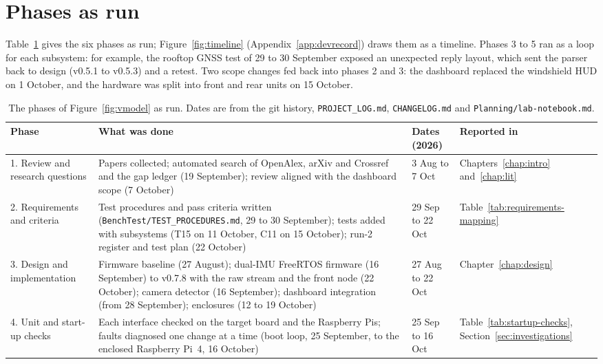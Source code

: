 \section{Phases as run}
\label{sec:phases}

Table~\ref{tab:phases} gives the six phases as run; Figure~\ref{fig:timeline} (Appendix~\ref{app:devrecord}) draws them as a timeline. Phases 3 to 5 ran as a loop for each subsystem: for example, the rooftop GNSS test of 29 to 30 September exposed an unexpected reply layout, which sent the parser back to design (v0.5.1 to v0.5.3) and a retest. Two scope changes fed back into phases 2 and 3: the dashboard replaced the windshield HUD on 1 October, and the hardware was split into front and rear units on 15 October.

\begin{table}[htbp]
\centering
\small
\caption[The phases of Figure~\ref{fig:vmodel} as run]{The phases of Figure~\ref{fig:vmodel} as run. Dates are from the git history, \texttt{PROJECT\_LOG.md}, \texttt{CHANGELOG.md} and \texttt{Planning/lab-notebook.md}.}
\label{tab:phases}
\begin{tabular}{|p{2.6cm}|p{6.6cm}|p{2.6cm}|p{2.0cm}|}
\hline
\textbf{Phase} & \textbf{What was done} & \textbf{Dates (2026)} & \textbf{Reported in} \\ \hline
1. Review and research questions & Papers collected; automated search of OpenAlex, arXiv and Crossref and the gap ledger (19 September); review aligned with the dashboard scope (7 October) & 3 Aug to 7 Oct & Chapters~\ref{chap:intro} and~\ref{chap:lit} \\ \hline
2. Requirements and criteria & Test procedures and pass criteria written (\texttt{BenchTest/\allowbreak{}TEST\_\allowbreak{}PROCEDURES.md}, 29 to 30 September); tests added with subsystems (T15 on 11 October, C11 on 15 October); run-2 register and test plan (22 October) & 29 Sep to 22 Oct & Table~\ref{tab:requirements-mapping} \\ \hline
3. Design and implementation & Firmware baseline (27 August); dual-IMU FreeRTOS firmware (16 September) to v0.7.8 with the raw stream and the front node (22 October); camera detector (16 September); dashboard integration (from 28 September); enclosures (12 to 19 October) & 27 Aug to 22 Oct & Chapter~\ref{chap:design} \\ \hline
4. Unit and start-up checks & Each interface checked on the target board and the Raspberry Pis; faults diagnosed one change at a time (boot loop, 25 September, to the enclosed Raspberry Pi~4, 16 October) & 25 Sep to 16 Oct & Table~\ref{tab:startup-checks}, Section~\ref{sec:investigations} \\ \hline

\end{tabular}
\end{table}
